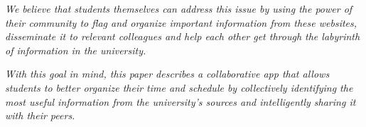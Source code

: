 \textit{We believe that students themselves can address this issue by using the power of their community to flag and organize important information from these websites, disseminate it to relevant colleagues and help each other get through the labyrinth of information in the university.}

\textit{With this goal in mind, this paper describes a collaborative app that allows students to better organize their time and schedule by collectively identifying the most useful information from the university's sources and intelligently sharing it with their peers.}

\vspace*{\fill}